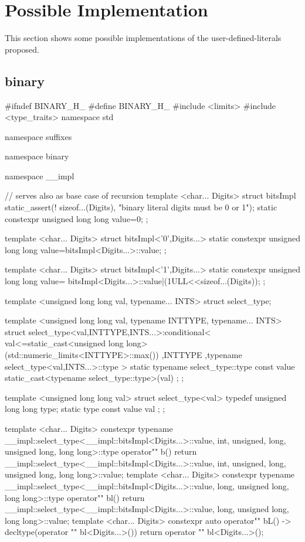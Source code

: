 \documentclass[ebook,11pt,article]{memoir}
\begin{document}
\chapter{Possible Implementation}
This section shows some possible implementations of the user-defined-literals proposed.

\section{binary}
\begin{codeblock}
#ifndef BINARY_H_
#define BINARY_H_
#include <limits>
#include <type_traits>
namespace std{
namespace suffixes{
namespace binary{
namespace __impl{
// serves also as base case of recursion
template <char... Digits>
struct bitsImpl{
	static_assert(! sizeof...(Digits),
			"binary literal digits must be 0 or 1");
	static constexpr unsigned long long value=0;
};

template <char... Digits>
struct bitsImpl<'0',Digits...>{
	static constexpr unsigned long long value=bitsImpl<Digits...>::value;
};

template <char... Digits>
struct bitsImpl<'1',Digits...>{
	static constexpr unsigned long long value=
			bitsImpl<Digits...>::value|(1ULL<<sizeof...(Digits));
};

template <unsigned long long val, typename... INTS>
struct select_type;

template <unsigned long long val, typename INTTYPE, typename... INTS>
struct select_type<val,INTTYPE,INTS...>:conditional<
	val<=static_cast<unsigned long long>(std::numeric_limits<INTTYPE>::max())
	,INTTYPE
	,typename select_type<val,INTS...>::type >{
	static typename select_type::type const
		value{ static_cast<typename select_type::type>(val) };
};

template <unsigned long long val>
struct select_type<val>{
	typedef unsigned long long type;
	static type const value{  val };
};

}


template <char... Digits>
constexpr typename
__impl::select_type<__impl::bitsImpl<Digits...>::value,
      int, unsigned, long, unsigned long, long long>::type
operator"" b(){
	return	__impl::select_type<__impl::bitsImpl<Digits...>::value,
			int, unsigned, long, unsigned long, long long>::value;
}
template <char... Digits>
constexpr typename
__impl::select_type<__impl::bitsImpl<Digits...>::value,
      long, unsigned long, long long>::type
operator"" bl(){
	return	__impl::select_type<__impl::bitsImpl<Digits...>::value,
			      long, unsigned long, long long>::value;
}
template <char... Digits>
constexpr auto
operator"" bL() -> decltype(operator "" bl<Digits...>()){
	return 	operator "" bl<Digits...>();
}

}}}
\end{codeblock}
\end{document}
